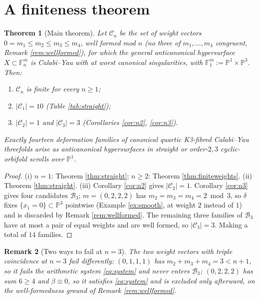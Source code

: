\documentclass[11pt]{article}
\newtheorem{theorem}{Theorem}[section]
\newtheorem{remark}[theorem]{Remark}
\newcommand{\PP}{\mathbb{P}}
\begin{document}
	\section{A finiteness theorem}
	
	\begin{theorem}[Main theorem]\label{thm:main}
		Let $\mathcal{C}_n$ be the set of weight vectors $0=m_1\le m_2\le m_3\le m_4$, well formed mod $n$ (no three of $m_1,\dots,m_4$ congruent, Remark \ref{rem:wellformed}), for which the general anticanonical hypersurface $X\subset\mathbb{F}^m_n$ is Calabi--Yau with at worst canonical singularities, with $\mathbb{F}^m_1:=\PP^1\times\PP^3$. Then:
		\begin{enumerate}[label=(\roman*)]
			\item $\mathcal{C}_n$ is finite for every $n\ge1$;
			\item $|\mathcal{C}_1|=10$ (Table \ref{tab:straight});
			\item $|\mathcal{C}_2|=1$ and $|\mathcal{C}_3|=3$ (Corollaries \ref{cor:n2}, \ref{cor:n3}).
		\end{enumerate}
		Exactly fourteen deformation families of canonical quartic K3-fibred Calabi--Yau threefolds arise as anticanonical hypersurfaces in straight or order-$2,3$ cyclic-orbifold scrolls over $\PP^1$.
	\end{theorem}
	
	\begin{proof}
		(i) $n=1$: Theorem \ref{thm:straight}; $n\ge2$: Theorem \ref{thm:finiteweights}. (ii) Theorem \ref{thm:straight}. (iii) Corollary \ref{cor:n2} gives $|\mathcal C_2|=1$. Corollary \ref{cor:n3} gives four candidates $\mathcal B_3$; $m=(0,2,2,2)$ has $m_2=m_3=m_4=2\bmod3$, so $\delta$ fixes $\{x_1=0\}\subset\PP^3$ pointwise (Example \ref{ex:smooth}, at weight $2$ instead of $1$) and is discarded by Remark \ref{rem:wellformed}. The remaining three families of $\mathcal B_3$ have at most a pair of equal weights and are well formed, so $|\mathcal C_3|=3$. Making a total of $14$ families.
	\end{proof}
	
	\begin{remark}[Two ways to fail at $n=3$]\label{rem:twinfailures}
		The two weight vectors with triple coincidence at $n=3$ fail differently: $(0,1,1,1)$ has $m_2+m_3+m_4=3<n+1$, so it fails the arithmetic system \eqref{eq:system} and never enters $\mathcal B_3$; $(0,2,2,2)$ has sum $6\ge4$ and $\beta\equiv0$, so it satisfies \eqref{eq:system} and is excluded only afterward, on the well-formedness ground of Remark \ref{rem:wellformed}.
	\end{remark}
	
\end{document}
